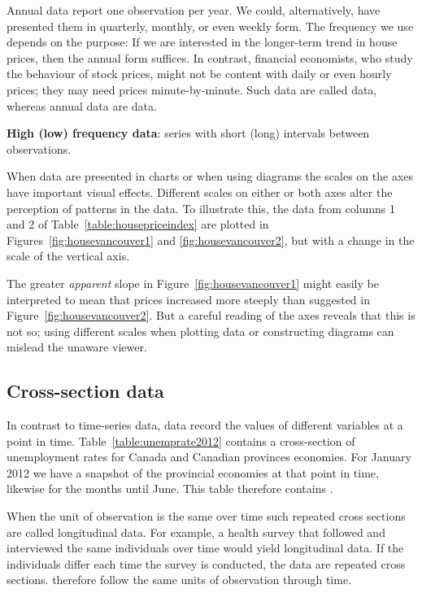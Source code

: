 Annual data report one observation per year. We could, alternatively, have presented them in quarterly, monthly, or even weekly form. The frequency we use depends on the purpose: If we are interested in the longer-term trend in house prices, then the annual form suffices. In contrast, financial economists, who study the behaviour of stock prices, might not be content with daily or even hourly prices; they may need prices minute-by-minute. Such data are called  data, whereas annual data are  data.

\begin{DefBox}
\textbf{High (low) frequency data}: series with short (long) intervals between observations.
\end{DefBox}

When data are presented in charts or when using diagrams the scales on the axes have important visual effects. Different scales on either or both axes alter the perception of patterns in the data. To illustrate this, the data from columns 1 and 2 of Table~\ref{table:housepriceindex} are plotted in Figures~\ref{fig:housevancouver1} and \ref{fig:housevancouver2}, but with a change in the scale of the vertical axis.




The greater \textit{apparent} slope in Figure~\ref{fig:housevancouver1} might easily be interpreted to mean that prices increased more steeply than suggested in Figure~\ref{fig:housevancouver2}. But a careful reading of the axes reveals that this is not so; using different scales when plotting data or constructing diagrams can mislead the unaware viewer. 

\subsection*{Cross-section data}

In contrast to time-series data,  data record the values of different variables at a point in time. Table~\ref{table:unemprate2012} contains a cross-section of unemployment rates for Canada and Canadian provinces economies. For January 2012 we have a snapshot of the provincial economies at that point in time, likewise for the months until June. This table therefore contains .

When the unit of observation is the same over time such repeated cross sections are called longitudinal data. For example, a health survey that followed and interviewed the same individuals over time would yield longitudinal data. If the individuals differ each time the survey is conducted, the data are repeated cross sections.  therefore follow the same units of observation through time.

